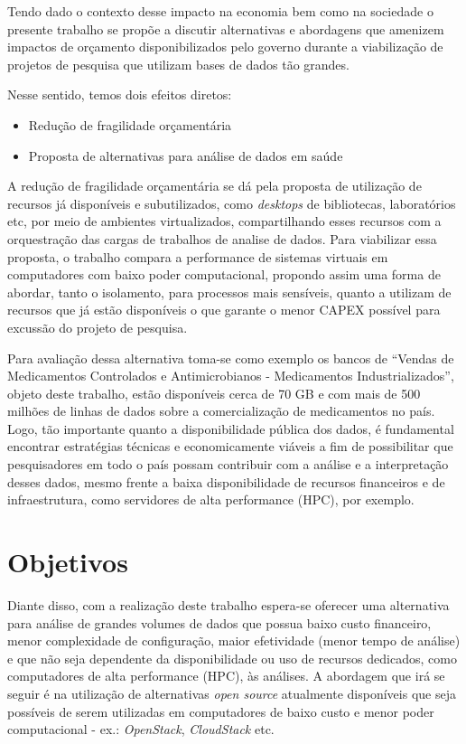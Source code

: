 Tendo dado o contexto desse impacto na economia bem como na sociedade o presente trabalho se propõe a discutir alternativas e abordagens que amenizem impactos de orçamento disponibilizados pelo governo durante a viabilização de projetos de pesquisa que utilizam bases de dados tão grandes.

Nesse sentido, temos dois efeitos diretos:

\begin{itemize}
    \item Redução de fragilidade orçamentária
    \item Proposta de alternativas para análise de dados em saúde
\end{itemize}

A redução de fragilidade orçamentária se dá pela proposta de utilização de recursos já disponíveis e subutilizados, como \emph{desktops} de bibliotecas, laboratórios etc, por meio de ambientes virtualizados, compartilhando esses recursos com a orquestração das cargas de trabalhos de analise de dados. Para viabilizar essa proposta, o trabalho compara a performance de sistemas virtuais em computadores com baixo poder computacional, propondo assim uma forma de abordar, tanto o isolamento, para processos mais sensíveis, quanto a utilizam de recursos que já estão disponíveis o que garante o menor CAPEX possível para excussão do projeto de pesquisa. 

Para avaliação dessa alternativa toma-se como exemplo os bancos de “Vendas de Medicamentos Controlados e Antimicrobianos - Medicamentos Industrializados”, objeto deste trabalho, estão disponíveis cerca de 70 GB e com mais de 500 milhões de linhas de dados sobre a comercialização de medicamentos no país. Logo, tão importante quanto a disponibilidade pública dos dados, é fundamental encontrar estratégias técnicas e economicamente viáveis a fim de possibilitar que pesquisadores em todo o país possam contribuir com a análise e a interpretação desses dados, mesmo frente a baixa disponibilidade de recursos financeiros e de infraestrutura, como servidores de alta performance (HPC), por exemplo.

\section{Objetivos}
\label{sec:objetivos}
Diante disso, com a realização deste trabalho espera-se oferecer uma alternativa para análise de grandes volumes de dados que possua baixo custo financeiro, menor complexidade de configuração, maior efetividade (menor tempo de análise) e que não seja dependente da disponibilidade ou uso de recursos dedicados, como computadores de alta performance (HPC), às análises. A abordagem que irá se seguir é na utilização de alternativas \emph{open source} atualmente disponíveis que seja possíveis de serem utilizadas em computadores de baixo custo e menor poder computacional - ex.: \emph{OpenStack}, \emph{CloudStack} etc.

